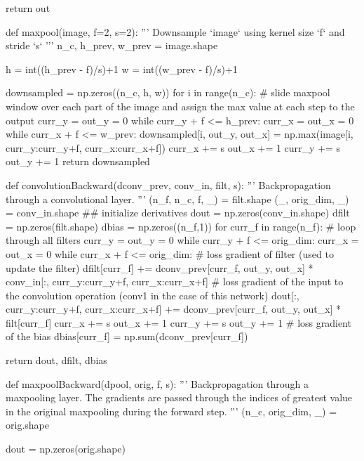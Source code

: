     return out
\stoptyping

\starttyping
def maxpool(image, f=2, s=2):
    '''
    Downsample `image` using kernel size `f` and stride `s`
    '''
    n_c, h_prev, w_prev = image.shape
    
    h = int((h_prev - f)/s)+1
    w = int((w_prev - f)/s)+1
    
    downsampled = np.zeros((n_c, h, w))
    for i in range(n_c):
        # slide maxpool window over each part of the image and assign the max value at each step to the output
        curr_y = out_y = 0
        while curr_y + f <= h_prev:
            curr_x = out_x = 0
            while curr_x + f <= w_prev:
                downsampled[i, out_y, out_x] = np.max(image[i, curr_y:curr_y+f, curr_x:curr_x+f])
                curr_x += s
                out_x += 1
            curr_y += s
            out_y += 1
    return downsampled
\stoptyping

\starttyping
def convolutionBackward(dconv_prev, conv_in, filt, s):
    '''
    Backpropagation through a convolutional layer. 
    '''
    (n_f, n_c, f, _) = filt.shape
    (_, orig_dim, _) = conv_in.shape
    ## initialize derivatives
    dout = np.zeros(conv_in.shape) 
    dfilt = np.zeros(filt.shape)
    dbias = np.zeros((n_f,1))
    for curr_f in range(n_f):
        # loop through all filters
        curr_y = out_y = 0
        while curr_y + f <= orig_dim:
            curr_x = out_x = 0
            while curr_x + f <= orig_dim:
                # loss gradient of filter (used to update the filter)
                dfilt[curr_f] += dconv_prev[curr_f, out_y, out_x] * conv_in[:, curr_y:curr_y+f, curr_x:curr_x+f]
                # loss gradient of the input to the convolution operation (conv1 in the case of this network)
                dout[:, curr_y:curr_y+f, curr_x:curr_x+f] += dconv_prev[curr_f, out_y, out_x] * filt[curr_f] 
                curr_x += s
                out_x += 1
            curr_y += s
            out_y += 1
        # loss gradient of the bias
        dbias[curr_f] = np.sum(dconv_prev[curr_f])
    
    return dout, dfilt, dbias
\stoptyping

\starttyping
def maxpoolBackward(dpool, orig, f, s):
    '''
    Backpropagation through a maxpooling layer. The gradients are passed through the indices of greatest value in the original maxpooling during the forward step.
    '''
    (n_c, orig_dim, _) = orig.shape
    
    dout = np.zeros(orig.shape)
    
